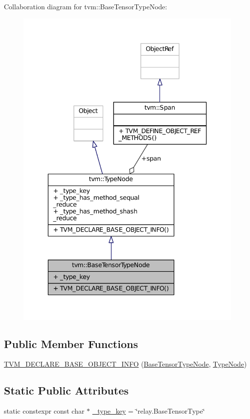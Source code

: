 Collaboration diagram for tvm\+:\+:Base\+Tensor\+Type\+Node\+:
\nopagebreak
\begin{figure}[H]
\begin{center}
\leavevmode
\includegraphics[width=336pt]{classtvm_1_1BaseTensorTypeNode__coll__graph}
\end{center}
\end{figure}
\subsection*{Public Member Functions}
\begin{DoxyCompactItemize}
\item 
\hyperlink{classtvm_1_1BaseTensorTypeNode_afc675db92c700532b65fe819b1a37eb5}{T\+V\+M\+\_\+\+D\+E\+C\+L\+A\+R\+E\+\_\+\+B\+A\+S\+E\+\_\+\+O\+B\+J\+E\+C\+T\+\_\+\+I\+N\+FO} (\hyperlink{classtvm_1_1BaseTensorTypeNode}{Base\+Tensor\+Type\+Node}, \hyperlink{classtvm_1_1TypeNode}{Type\+Node})
\end{DoxyCompactItemize}
\subsection*{Static Public Attributes}
\begin{DoxyCompactItemize}
\item 
static constexpr const char $\ast$ \hyperlink{classtvm_1_1BaseTensorTypeNode_a206bc6500bcacd821703cf8a5db2541b}{\+\_\+type\+\_\+key} = \char`\"{}relay.\+Base\+Tensor\+Type\char`\"{}
\end{DoxyCompactItemize}
